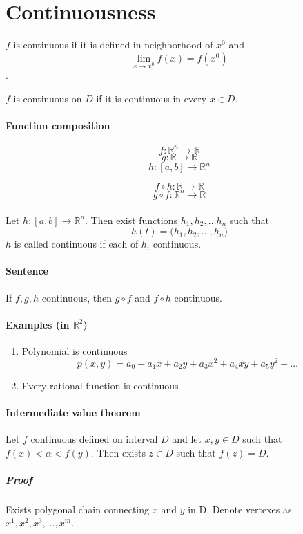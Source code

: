 \section{Continuousness}
$f$ is continuous if it is defined in neighborhood of $x^0$  and
$$\lim_{x\to x^0} f(x) = f(x^0)$$.

$f$ is continuous on $D$ if it is continuous in every $x\in D$.

\paragraph{Function composition}

$$f: \mathbb{R}^n \to \mathbb{R}$$
$$g: \mathbb{R} \to \mathbb{R}$$
$$h: [a,b] \to \mathbb{R}^n$$

$$f\circ h: \mathbb{R} \to \mathbb{R}$$
$$g\circ f: \mathbb{R}^n \to \mathbb{R}$$

\paragraph{}
Let $h: [a,b] \to \mathbb{R}^n$. Then exist functions $h_1, h_2, \dots h_n$ such that
$$h(t) = \big( h_1, h_2, \dots, h_n \big)$$
$h$ is called  continuous if each of $h_i$ continuous.


\paragraph{Sentence}
If $f,g,h$ continuous, then $g\circ f$ and $f\circ h$ continuous.

\paragraph{Examples (in $\mathbb{R}^2$)}
\begin{enumerate}
	\item Polynomial is continuous
	$$p(x,y) = a_0 + a_1x +a_2y +a_3x^2 + a_4xy +a_5y^2 + \dots$$
	\item Every rational function is continuous
\end{enumerate}

\paragraph{Intermediate value theorem}
Let $f$ continuous defined on interval $D$ and let $x,y \in D$ such that $f(x) < \alpha < f(y)$. Then exists $z \in D$ such that $f(z) = D$.

\subparagraph{Proof}
Exists polygonal chain connecting $x$ and $y$ in D. Denote vertexes as $x^1, x^2, x^3, \dots, x^m$. 

